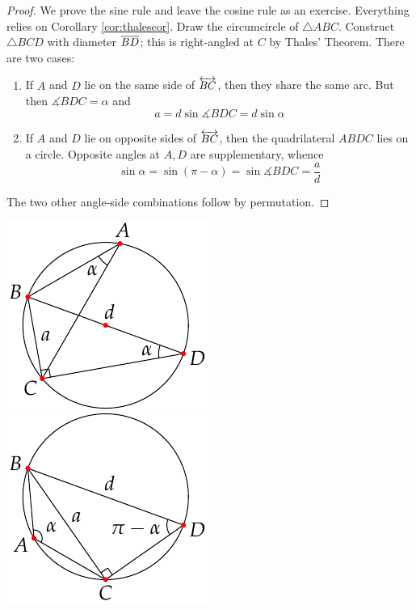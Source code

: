 \begin{minipage}[t]{0.72\linewidth}\vspace{0pt}
	\begin{proof}
		We prove the sine rule and leave the cosine rule as an exercise. Everything relies on Corollary \ref{cor:thalescor}. Draw the circumcircle of $\triangle ABC$. Construct $\triangle BCD$ with diameter $\overline{BD}$; this is right-angled at $C$ by Thales' Theorem. There are two cases:
		\begin{enumerate}
		  \item If $A$ and $D$ lie on the same side of $\overleftrightarrow{BC}$, then they share the same arc. But then $\measuredangle BDC=\alpha$ and
		  \[
		  	a=d\sin\measuredangle BDC=d\sin\alpha
		  \]
		  \item If $A$ and $D$ lie on opposite sides of $\overleftrightarrow{BC}$, then the quadrilateral $ABDC$ lies on a circle. Opposite angles at $A,D$ are supplementary, whence
			\[
				\sin\alpha=\sin(\pi-\alpha)=\sin\measuredangle BDC=\frac ad
			\]
		\end{enumerate}
		The two other angle-side combinations follow by permutation.\phantom{\qedhere}
	\end{proof}
\end{minipage}
\hfill
\begin{minipage}[t]{0.25\linewidth}\vspace{-5pt}
	\flushright\includegraphics[scale=0.95]{angles-sinerule}\smallbreak
	\includegraphics[scale=0.95]{angles-sinerule2}\\[-20pt]
	\hfill\qedsymbol
\end{minipage}


